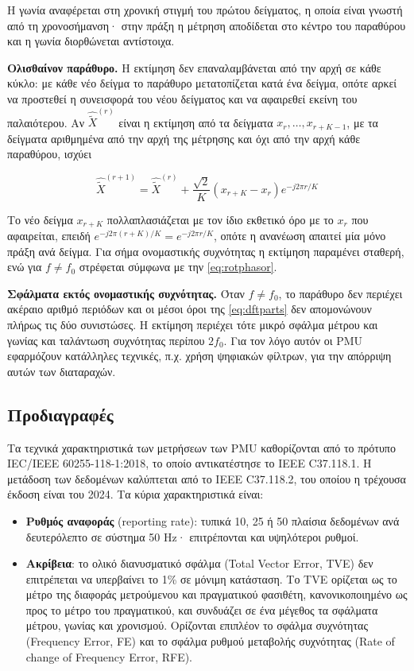 Η γωνία αναφέρεται στη χρονική στιγμή του πρώτου δείγματος, η οποία είναι γνωστή από τη
χρονοσήμανση· στην πράξη η μέτρηση αποδίδεται στο κέντρο του παραθύρου και η γωνία
διορθώνεται αντίστοιχα.

\textbf{Ολισθαίνον παράθυρο.} Η εκτίμηση δεν επαναλαμβάνεται από την αρχή σε κάθε κύκλο: με
κάθε νέο δείγμα το παράθυρο μετατοπίζεται κατά ένα δείγμα, οπότε αρκεί να προστεθεί η
συνεισφορά του νέου δείγματος και να αφαιρεθεί εκείνη του παλαιότερου. Αν
$\hat{\tilde{X}}^{(r)}$ είναι η εκτίμηση από τα δείγματα $x_r, \ldots, x_{r+K-1}$, με τα
δείγματα αριθμημένα από την αρχή της μέτρησης και όχι από την αρχή κάθε παραθύρου, ισχύει

\begin{equation}
\hat{\tilde{X}}^{(r+1)} = \hat{\tilde{X}}^{(r)}
+ \frac{\sqrt{2}}{K}\left(x_{r+K} - x_r\right) e^{-j2\pi r/K}
\label{eq:recdft}
\end{equation}

Το νέο δείγμα $x_{r+K}$ πολλαπλασιάζεται με τον ίδιο εκθετικό όρο με το $x_r$ που αφαιρείται,
επειδή $e^{-j2\pi(r+K)/K} = e^{-j2\pi r/K}$, οπότε η ανανέωση απαιτεί μία μόνο πράξη ανά
δείγμα. Για σήμα ονομαστικής συχνότητας η εκτίμηση παραμένει σταθερή, ενώ για $f \neq f_0$
στρέφεται σύμφωνα με την \eqref{eq:rotphasor}.

\textbf{Σφάλματα εκτός ονομαστικής συχνότητας.} Όταν $f \neq f_0$, το παράθυρο δεν περιέχει
ακέραιο αριθμό περιόδων και οι μέσοι όροι της \eqref{eq:dftparts} δεν απομονώνουν
πλήρως τις δύο συνιστώσες. Η εκτίμηση περιέχει τότε μικρό σφάλμα μέτρου και γωνίας και ταλάντωση
συχνότητας περίπου $2f_0$. Για τον λόγο αυτόν οι PMU εφαρμόζουν κατάλληλες τεχνικές, π.χ. χρήση ψηφιακών φίλτρων, για την απόρριψη αυτών των διαταραχών.


\subsection{Προδιαγραφές}

Τα τεχνικά χαρακτηριστικά των μετρήσεων των PMU καθορίζονται από το πρότυπο IEC/IEEE
60255-118-1:2018, το οποίο αντικατέστησε το IEEE C37.118.1. Η μετάδοση των δεδομένων
καλύπτεται από το IEEE C37.118.2, του οποίου η τρέχουσα έκδοση είναι του 2024. Τα κύρια
χαρακτηριστικά είναι:

\begin{itemize}
\item \textbf{Ρυθμός αναφοράς} (reporting rate): τυπικά 10, 25 ή 50 πλαίσια δεδομένων ανά
      δευτερόλεπτο σε σύστημα 50 Hz· επιτρέπονται και υψηλότεροι ρυθμοί.
\item \textbf{Ακρίβεια}: το ολικό διανυσματικό σφάλμα (Total Vector Error, TVE) δεν
      επιτρέπεται να υπερβαίνει το 1\% σε μόνιμη κατάσταση. Το TVE ορίζεται ως το μέτρο της
      διαφοράς μετρούμενου και πραγματικού φασιθέτη, κανονικοποιημένο ως προς το μέτρο του
      πραγματικού, και συνδυάζει σε ένα μέγεθος τα σφάλματα μέτρου, γωνίας και χρονισμού.
      Ορίζονται επιπλέον το σφάλμα συχνότητας (Frequency Error, FE) και το σφάλμα ρυθμού
      μεταβολής συχνότητας (Rate of change of Frequency Error, RFE).
\end{itemize}

